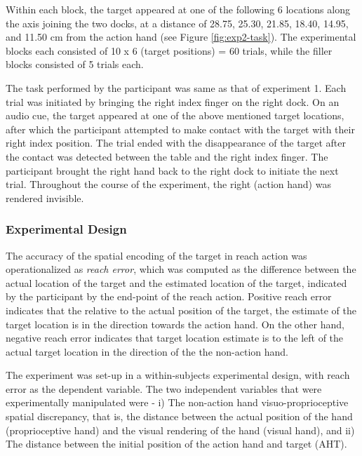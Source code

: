 

Within each block, the target appeared at one of the following 6 locations along the axis joining the two docks, at a distance of  28.75, 25.30, 21.85, 18.40, 14.95, and 11.50 cm from the action hand (see Figure \ref{fig:exp2-task}). The experimental blocks each consisted of 10 x 6 (target positions) = 60 trials, while the filler blocks consisted of 5 trials each. 

The task performed by the participant was same as that of experiment 1. Each trial was initiated by bringing the right index finger on the right dock. On an audio cue, the target appeared at one of the above mentioned target locations, after which the participant attempted to make contact with the target with their right index position. The trial ended with the disappearance of the target after the contact was detected between the table and the right index finger. The participant brought the right hand back to the right dock to initiate the next trial. Throughout the course of the experiment, the right (action hand) was rendered invisible. 


\subsubsection{Experimental Design}

The accuracy of the spatial encoding of the target in reach action was operationalized as \textit{reach error}, which was computed as the difference between the actual location of the target and the estimated location of the target, indicated by the participant by the end-point of the reach action. Positive reach error indicates that the relative to the actual position of the target, the estimate of the target location is in the direction towards the action hand. On the other hand, negative reach error indicates that target location estimate is to the left of the actual target location in the direction of the the non-action hand. 

The experiment was set-up in a within-subjects experimental design, with reach error as the dependent variable. The two independent variables that were experimentally manipulated were - i) The non-action hand visuo-proprioceptive spatial discrepancy, that is, the distance between the actual position of the hand (proprioceptive hand) and the visual rendering of the hand (visual hand), and ii) The distance between the initial position of the action hand and target (AHT). 

